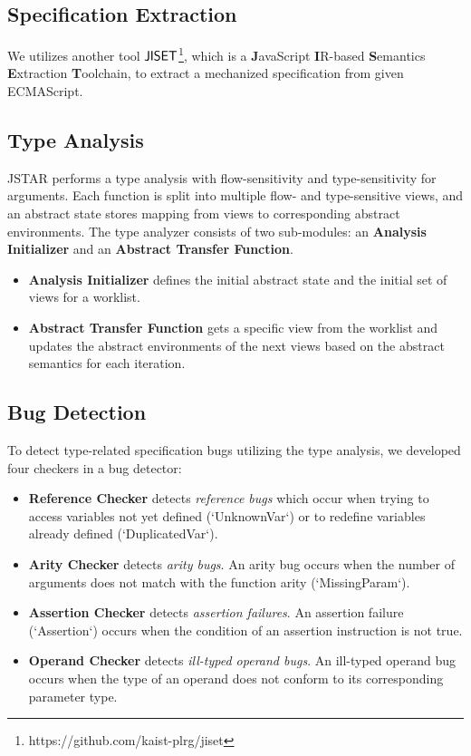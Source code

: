 \documentclass[10pt,conference]{IEEEtran}
\newcommand{\stextsf}[1]{\textsf{\small #1}}
\newcommand{\jiset}{\stextsf{JISET}}
\begin{document}
\subsection{Specification Extraction}
We utilizes another tool $\jiset$\footnote{https://github.com/kaist-plrg/jiset},
which is a \textbf{J}avaScript \textbf{I}R-based \textbf{S}emantics
\textbf{E}xtraction \textbf{T}oolchain, to extract a mechanized specification
from given ECMAScript.

\subsection{Type Analysis}
JSTAR performs a type analysis with flow-sensitivity and type-sensitivity for
arguments.  Each function is split into multiple flow- and type-sensitive views,
and an abstract state stores mapping from views to corresponding abstract
environments.  The type analyzer consists of two sub-modules: an
\textbf{Analysis Initializer} and an \textbf{Abstract Transfer Function}.
\begin{itemize}
  \item \textbf{Analysis Initializer} defines the initial abstract state and the initial
    set of views for a worklist.
  \item \textbf{Abstract Transfer Function} gets a specific view from the worklist and
    updates the abstract environments of the next views based on the abstract
    semantics for each iteration.
\end{itemize}

\subsection{Bug Detection}
To detect type-related specification bugs utilizing the type analysis, we
developed four checkers in a bug detector:

\begin{itemize}
  \item \textbf{Reference Checker} detects \textit{reference bugs} which occur
    when trying to access variables not yet defined (`UnknownVar`) or to
    redefine variables already defined (`DuplicatedVar`).
  \item \textbf{Arity Checker} detects \textit{arity bugs}. An arity bug occurs
    when the number of arguments does not match with the function arity
    (`MissingParam`).
  \item \textbf{Assertion Checker} detects \textit{assertion failures}. An
    assertion failure (`Assertion`) occurs when the condition of an assertion
    instruction is not true.
  \item \textbf{Operand Checker} detects \textit{ill-typed operand bugs}. An
    ill-typed operand bug occurs when the type of an operand does not conform to
    its corresponding parameter type.
\end{itemize}
\end{document}
